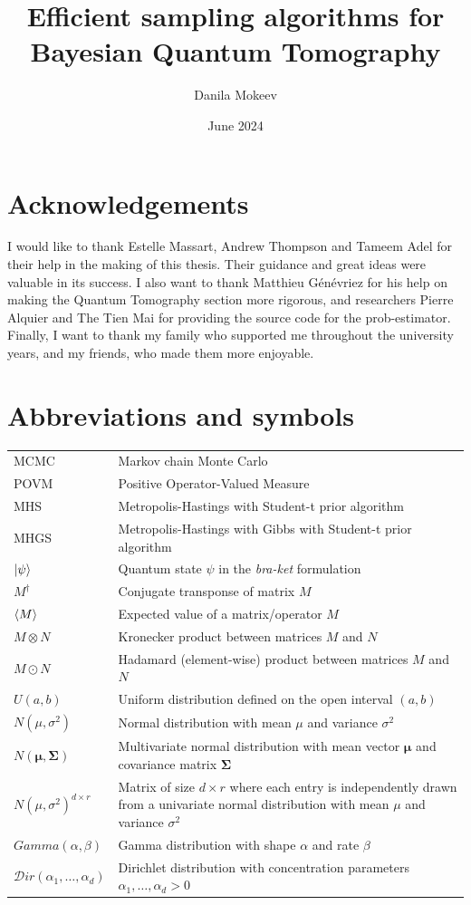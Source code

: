 \documentclass[12pt]{memoir}
\title{Efficient sampling algorithms for Bayesian Quantum Tomography}
\author{Danila Mokeev}
\date{June 2024}
\newcommand{\ti}{\textit}
\begin{document}


\chapter*{Acknowledgements}
I would like to thank Estelle Massart, Andrew Thompson and Tameem Adel for their help in the making of this thesis. Their guidance and great ideas were valuable in its success. I also want to thank Matthieu Génévriez for his help on making the Quantum Tomography section more rigorous, and researchers Pierre Alquier and The Tien Mai for providing the source code for the prob-estimator. Finally, I want to thank my family who supported me throughout the university years, and my friends, who made them more enjoyable.
\newpage

\tableofcontents*

\newpage

\chapter*{Abbreviations and symbols}
\begin{tabular}{p{0.2\linewidth} | p{0.8\linewidth}}
{MCMC} & Markov chain Monte Carlo\\
{POVM} & Positive Operator-Valued Measure\\
{MHS}  & Metropolis-Hastings with Student-t prior algorithm \\
{MHGS}  & Metropolis-Hastings with Gibbs with Student-t prior algorithm\\
$\ket{{\psi}}$ & Quantum state $\psi$ in the \ti{bra-ket} formulation\\
${M^\dagger}$ & Conjugate transponse of matrix $M$\\
$\braket{M}$ & Expected value of a matrix/operator $M$\\
${M\otimes N}$ & Kronecker product between matrices $M$ and $N$\\
${M \odot N}$ & Hadamard (element-wise) product between matrices $M$ and $N$\\
${U}(a,b)$ & Uniform distribution defined on the open interval $(a,b)$\\
$N(\mu, \sigma^2)$ & Normal distribution with mean $\mu$ and variance $\sigma^2$\\
$N(\boldsymbol{\mu},\boldsymbol{\Sigma})$ & Multivariate normal distribution with mean vector $\boldsymbol{\mu}$ and covariance matrix $\boldsymbol{\Sigma}$\\
$N(\mu, \sigma^2)^{d \times r}$& Matrix of size $d\times r $ where each entry is independently drawn from a univariate normal distribution with mean $\mu$ and variance $\sigma^2$ \\
$Gamma(\alpha,\beta)$ & Gamma distribution with shape $\alpha$ and rate $\beta$\\
$\mathcal{D}ir(\alpha_1,\dots,\alpha_d)$ & Dirichlet distribution with concentration parameters $\alpha_1,\dots,\alpha_d > 0$
\end{tabular}
\end{document}
